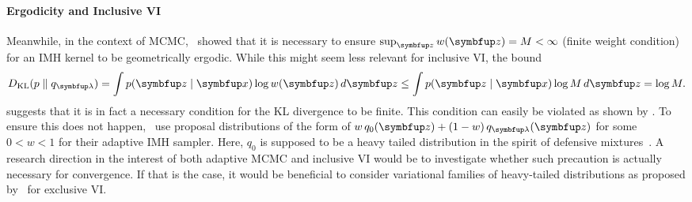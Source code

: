 \vspace{-0.1in}
\paragraph{Ergodicity and Inclusive VI}
Meanwhile, in the context of MCMC,~\citet{10.2307/2242610} showed that it is necessary to ensure \(\sup_{\vz} w(\vz) = M < \infty\) (finite weight condition) for an IMH kernel to be geometrically ergodic.
While this might seem less relevant for inclusive VI, the bound
%
\vspace{-0.02in}
\begin{align}
  \DKL{p}{q_{\vlambda}} = \int p(\vz\mid\vx) \log w(\vz)\,d\vz \leq \int p(\vz\mid\vx) \log M \, d\vz = \log M.
\end{align}
\vspace{-0.02in}
%
suggests that it is in fact a necessary condition for the KL divergence to be finite.
This condition can easily be violated as shown by \citet{10.1007/s11222-008-9110-y}.
To ensure this does not happen,~\citet{giordani_adaptive_2010, holden_adaptive_2009} use proposal distributions of the form of \(w\,q_0(\vz) + (1-w)\,q_{\vlambda}(\vz)\) for some \(0<w<1\) for their adaptive IMH sampler.
Here, \(q_0\) is supposed to be a heavy tailed distribution in the spirit of defensive mixtures~\citep{hesterberg_weighted_1995}.
A research direction in the interest of both adaptive MCMC and inclusive VI would be to investigate whether such precaution is actually necessary for convergence.
If that is the case, it would be beneficial to consider variational families of heavy-tailed distributions as proposed by~\citet{NEURIPS2018_25db67c5} for exclusive VI.


